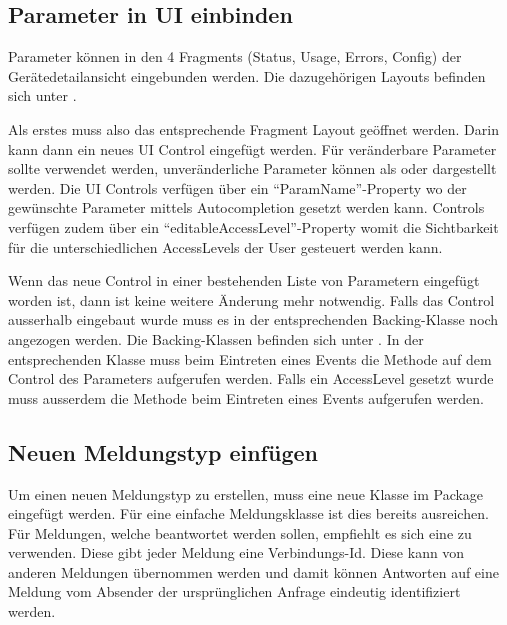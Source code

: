 \subsection{Parameter in UI einbinden}
\label{sub:parameter_einbinden}
Parameter können in den 4 Fragments (Status, Usage, Errors, Config) der Gerätedetailansicht eingebunden werden. Die dazugehörigen Layouts befinden sich unter .

Als erstes muss also das entsprechende Fragment Layout geöffnet werden. Darin kann dann ein neues UI Control eingefügt werden. Für veränderbare Parameter sollte  verwendet werden, unveränderliche Parameter können als  oder  dargestellt werden. Die UI Controls verfügen über ein \enquote{ParamName}-Property wo der gewünschte Parameter mittels Autocompletion gesetzt werden kann.  Controls verfügen zudem über ein \enquote{editableAccessLevel}-Property womit die Sichtbarkeit für die unterschiedlichen AccessLevels der User gesteuert werden kann.

Wenn das neue Control in einer bestehenden Liste von Parametern eingefügt worden ist, dann ist keine weitere Änderung mehr notwendig. Falls das Control ausserhalb eingebaut wurde muss es in der entsprechenden Backing-Klasse noch angezogen werden. Die Backing-Klassen befinden sich unter . In der entsprechenden Klasse muss beim Eintreten eines  Events die Methode  auf dem Control des Parameters aufgerufen werden. Falls ein AccessLevel gesetzt wurde muss ausserdem die Methode  beim Eintreten eines  Events aufgerufen werden.

\subsection{Neuen Meldungstyp einfügen}
Um einen neuen Meldungstyp zu erstellen, muss eine neue Klasse im Package \code{} eingefügt werden. Für eine einfache Meldungsklasse ist dies bereits ausreichen. Für Meldungen, welche beantwortet werden sollen, empfiehlt es sich eine  zu verwenden. Diese gibt jeder Meldung eine Verbindungs-Id. Diese kann von anderen Meldungen übernommen werden und damit können Antworten auf eine Meldung vom Absender der ursprünglichen Anfrage eindeutig identifiziert werden.

